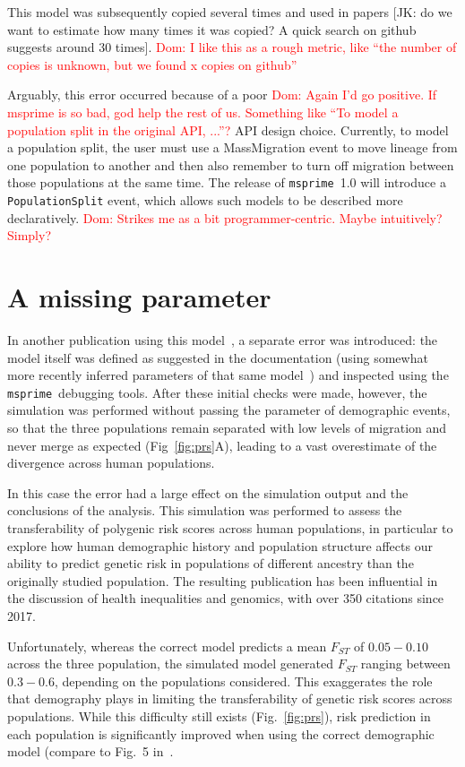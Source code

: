 \documentclass{article}
\newcommand{\msprime}[0]{\texttt{msprime}}
\newcommand{\dncomment}[1]{{\textcolor{red}{Dom: #1}}}
\begin{document}
This model was subsequently copied
several times and used in papers [JK: do we want to estimate how
many times it was copied? A quick search on github suggests around 30
times]. \dncomment{I like this as a rough metric, like ``the number of copies
is unknown, but we found x copies on github''}

Arguably, this error occurred because of a poor
\dncomment{Again I'd go positive. If msprime is so bad, god help the rest of us.
Something like ``To model a population split in the original API, ...''?}
API design choice.
Currently, to model a population split, the user must use a MassMigration event to move
lineage from one population to another and then also remember to turn off migration
between those populations at the same time.
The release of \msprime\ 1.0 will introduce a \texttt{PopulationSplit} event, which allows
such models to be described more declaratively.
\dncomment{Strikes me as a bit programmer-centric. Maybe intuitively? Simply?}

\section{A missing parameter}

In another publication using this model~\citep{martin2017human},
a separate error was introduced: the model itself was defined as suggested
in the documentation (using somewhat more recently inferred parameters of that same
model~\citep{gravel2011demographic}) and inspected using the \msprime\
debugging tools. After these initial checks were made, however, the simulation
was performed without passing the parameter of demographic events,
so that the three populations remain separated with low levels of migration and
never merge as expected (Fig~\ref{fig:prs}A),
leading to a vast overestimate of the divergence across human populations.

In this case the error had a large effect on the simulation output and
the conclusions of the analysis. This simulation was performed to assess the
transferability of polygenic risk scores across human populations, in particular to
explore how human demographic history and population structure affects our ability
to predict genetic risk in populations of different ancestry than the originally studied
population. The resulting publication has been influential in the discussion of
health inequalities and genomics, with over 350 citations since 2017.

Unfortunately, whereas the correct model predicts a mean $F_{ST}$ of
$0.05 - 0.10$ across the three population, the simulated model generated $F_{ST}$
ranging between $0.3 - 0.6$, depending on the populations considered.
This exaggerates the role that demography plays in limiting the transferability
of genetic risk scores across populations. While this difficulty still exists
(Fig.~\ref{fig:prs}), risk prediction in each population is significantly improved
when using the correct demographic model (compare to Fig.~5 in~\citet{martin2017human}.
\end{document}
